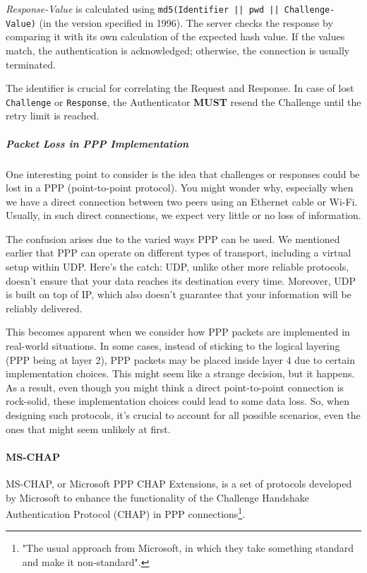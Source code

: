 \textit{Response-Value} is calculated using \texttt{md5(Identifier || pwd || Challenge-Value)} (in the version specified in 1996). The server checks the response by comparing it with its own calculation of the expected hash value. If the values match, the authentication is acknowledged; otherwise, the connection is usually terminated.

The identifier is crucial for correlating the Request and Response. In case of lost \texttt{Challenge} or \texttt{Response}, the Authenticator \textbf{MUST} resend the Challenge until the retry limit is reached.



\subparagraph{Packet Loss in PPP Implementation}
One interesting point to consider is the idea that challenges or responses could be lost in a PPP (point-to-point protocol). You might wonder why, especially when we have a direct connection between two peers using an Ethernet cable or Wi-Fi. Usually, in such direct connections, we expect very little or no loss of information.

The confusion arises due to the varied ways PPP can be used. We mentioned earlier that PPP can operate on different types of transport, including a virtual setup within UDP. Here's the catch: UDP, unlike other more reliable protocols, doesn't ensure that your data reaches its destination every time. Moreover, UDP is built on top of IP, which also doesn't guarantee that your information will be reliably delivered.

This becomes apparent when we consider how PPP packets are implemented in real-world situations. In some cases, instead of sticking to the logical layering (PPP being at layer 2), PPP packets may be placed inside layer 4 due to certain implementation choices. This might seem like a strange decision, but it happens. As a result, even though you might think a direct point-to-point connection is rock-solid, these implementation choices could lead to some data loss. So, when designing such protocols, it's crucial to account for all possible scenarios, even the ones that might seem unlikely at first.


\paragraph{MS-CHAP}
MS-CHAP, or Microsoft PPP CHAP Extensions, is a set of protocols developed by Microsoft to enhance the functionality of the Challenge Handshake Authentication Protocol (CHAP) in PPP connections\footnote{"The usual approach from Microsoft, in which they take something standard and make it non-standard".}.


